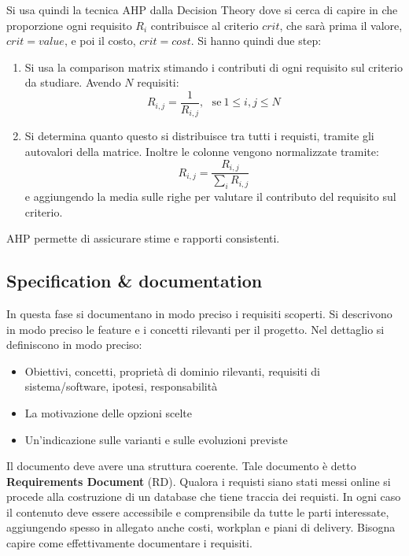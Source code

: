 Si usa quindi la tecnica AHP dalla Decision Theory dove si cerca di capire in che
proporzione ogni requisito $R_i$ contribuisce al criterio $crit$, che sarà prima
il valore, $crit = value$, e poi il costo, $crit = cost$. Si hanno quindi due step:
\begin{enumerate}
    \item Si usa la comparison matrix stimando i contributi di ogni requisito sul
          criterio da studiare. Avendo $N$ requisiti:
          \begin{equation}
              R_{i, j} = \frac{1}{R_{i, j}}, \ \ \ \text{se} \ 1 \leq i, j\leq N
          \end{equation}
    \item Si determina quanto questo si distribuisce tra tutti i requisti, tramite
          gli autovalori della matrice. Inoltre le colonne vengono normalizzate tramite:
          \begin{equation}
              R_{i, j} = \frac{R_{i, j}}{\sum_i R_{i, j}}
          \end{equation}
          e aggiungendo la media sulle righe per valutare il contributo del requisito
          sul criterio.
\end{enumerate}
AHP permette di assicurare stime e rapporti consistenti.
\subsection{Specification \& documentation}
In questa fase si documentano in modo preciso i requisiti scoperti. Si descrivono
in modo preciso le feature e i concetti rilevanti per il progetto. Nel dettaglio
si definiscono in modo preciso:
\begin{itemize}
    \item Obiettivi, concetti, proprietà di dominio rilevanti, requisiti di
          sistema/software, ipotesi, responsabilità
    \item La motivazione delle opzioni scelte
    \item Un'indicazione sulle varianti e sulle evoluzioni previste
\end{itemize}

Il documento deve avere una struttura coerente. Tale documento è detto
\textbf{Requirements Document} (RD). Qualora i requisti siano stati messi online
si procede alla costruzione di un database che tiene traccia dei requisti. In ogni
caso il contenuto deve essere accessibile e comprensibile da tutte le parti
interessate, aggiungendo spesso in allegato anche costi, workplan e piani di delivery.
Bisogna capire come effettivamente documentare i requisiti.

